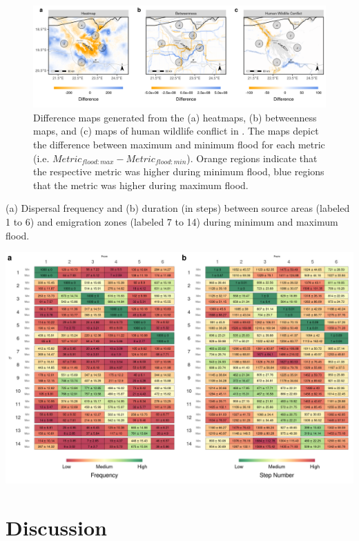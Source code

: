 \documentclass[abstract=on,10pt,a4paper,bibliography=totocnumbered]{article}
\begin{document}
\begin{figure}
  \begin{center}
  \includegraphics[width = \textwidth]{99_Difference.png}
  \caption{Difference maps generated from the (a) heatmaps, (b) betweenness
  maps, and (c) maps of human wildlife conflict in . The maps
  depict the difference between maximum and minimum flood for each metric (i.e.
  $Metric_{flood:max} - Metric_{flood:min}$). Orange regions indicate that the
  respective metric was higher during minimum flood, blue regions that the
  metric was higher during maximum flood.}
  \label{Difference}
  \end{center}
\end{figure}

\begin{table}
  \caption{(a) Dispersal frequency and (b) duration (in steps) between source
  areas (labeled 1 to 6) and emigration zones (labeled 7 to 14) during minimum
  and maximum flood.}
  \label{IPCTable}
  \includegraphics[width = \textwidth]{99_IPCTable.png}
\end{table}

\section{Discussion}
\end{document}
